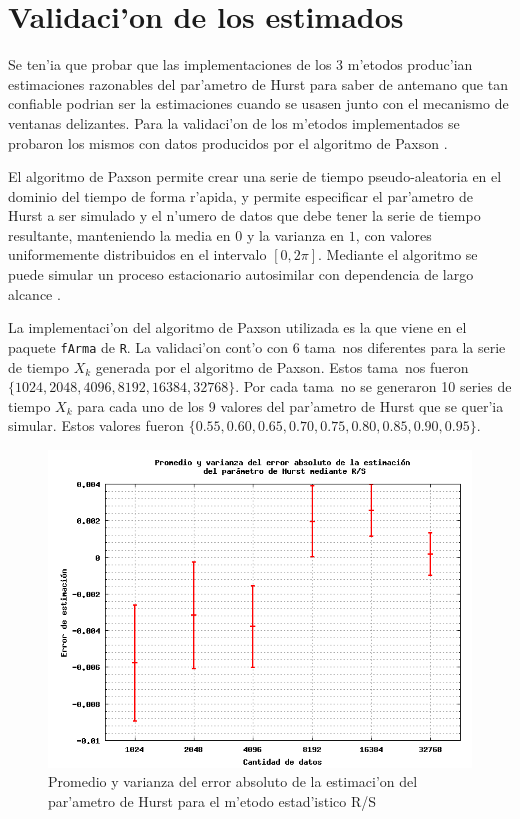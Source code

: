 \section{Validaci'on de los estimados} \label{sect:validacion}

Se ten'ia que probar que las implementaciones de los 3 m'etodos produc'ian
estimaciones razonables del par'ametro de Hurst para saber de antemano que tan
confiable podrian ser la estimaciones cuando se usasen junto con el mecanismo
de ventanas delizantes. Para la validaci'on de los m'etodos implementados se
probaron los mismos con datos producidos por el algoritmo de Paxson
\cite{Paxson95fastapproximation}.

El algoritmo de Paxson permite crear una serie de tiempo pseudo-aleatoria en
el dominio del tiempo de forma r'apida, y permite especificar el par'ametro de
Hurst a ser simulado y el n'umero de datos que debe tener la serie de tiempo
resultante, manteniendo la media en $0$ y la varianza en $1$, con valores
uniformemente distribuidos en el intervalo $[0,2\pi]$. Mediante el algoritmo
se puede simular un proceso estacionario autosimilar con dependencia de largo
alcance \cite{Paxson95fastapproximation}.

La implementaci'on del algoritmo de Paxson utilizada es la que viene en el 
paquete {\tt fArma} de {\tt R}. La validaci'on cont'o con 6 tama~nos diferentes
para la serie de tiempo $X_k$ generada por el algoritmo de Paxson. Estos 
tama~nos fueron $\{1024, 2048, 4096, 8192, 16384, 32768\}$. Por cada tama~no se
generaron 10 series de tiempo $X_k$ para cada uno de los 9 valores del
par'ametro de Hurst que se quer'ia simular. Estos valores fueron
$\{0.55, 0.60, 0.65, 0.70, 0.75, 0.80, 0.85, 0.90, 0.95 \}$. 

\begin{figure}[htb]
\centering
\includegraphics[scale=0.45,type=png,ext=.png,read=.png]{figures/abserror-rs}
\caption{Promedio y varianza del error absoluto de la estimaci'on del par'ametro
de Hurst para el m'etodo estad'istico R/S}
\label{fig:abserrrs}
\end{figure}

